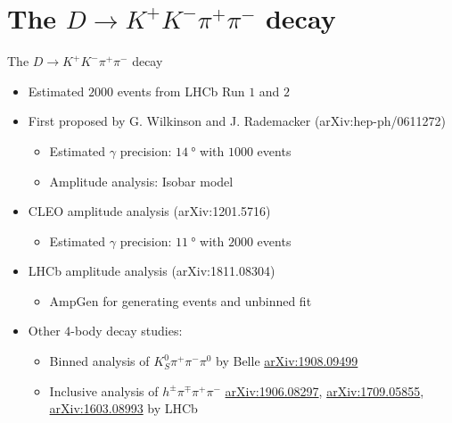 \documentclass{beamer}
\begin{document}
\section{The \texorpdfstring{$D\to K^+K^-\pi^+\pi^-$}{D to K+K-pi+pi-} decay}
\begin{frame}{The $D\to K^+K^-\pi^+\pi^-$ decay}
  \begin{itemize}
    \item{Estimated $2000$ events from LHCb Run $1$ and $2$}
    \vspace{0.2cm}
    \item{First proposed by G. Wilkinson and J. Rademacker (arXiv:hep-ph/0611272)}
    \begin{itemize}
      \item{Estimated $\gamma$ precision: $\SI{14}{\degree}$ with $1000$ events}
      \item{Amplitude analysis: Isobar model}
    \end{itemize}
    \vspace{0.2cm}
    \item{CLEO amplitude analysis (arXiv:1201.5716)}
    \begin{itemize}
      \item{Estimated $\gamma$ precision: $\SI{11}{\degree}$ with $2000$ events}
    \end{itemize}
    \vspace{0.2cm}
    \item{LHCb amplitude analysis (arXiv:1811.08304)}
    \begin{itemize}
      \item{AmpGen for generating events and unbinned fit}
    \end{itemize}
    \vspace{0.2cm}
    \item{Other $4$-body decay studies:}
    \begin{itemize}
      \item{Binned analysis of $K_S^0\pi^+\pi^-\pi^0$ by Belle \href{https://arxiv.org/abs/1908.09499}{arXiv:1908.09499}}
      \item{Inclusive analysis of $h^\pm\pi^\mp\pi^+\pi^-$ \href{https://arxiv.org/abs/1906.08297}{arXiv:1906.08297}, \href{https://arxiv.org/abs/1709.05855}{arXiv:1709.05855}, \href{https://arxiv.org/abs/1603.08993}{arXiv:1603.08993} by LHCb}
    \end{itemize}
  \end{itemize}
\end{frame}
\end{document}
